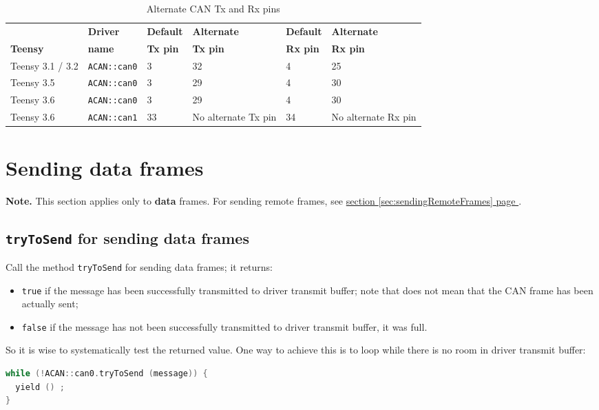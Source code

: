 \documentclass[9pt, a4paper, obeyspaces, openany]{extarticle}
\newcommand \sectionLabel[2]{\section{#1}\label{sec:#2}}
\newcommand\refSectionPage[1]{\hyperref[sec:#1]{section \ref*{sec:#1} page \pageref{sec:#1}}}
\newcommand\labelTableau[1]{\label{tab:#1}}
\begin{document}
\begin{table}[htbp]
  \small
  \onehalfspacing
  \centering
  \begin{tabular}{llllll}
                   &  \textbf{Driver}  &  \textbf{Default} & \textbf{Alternate} & \textbf{Default} & \textbf{Alternate}\\
    \textbf{Teensy}& \textbf{name} & \textbf{Tx pin} & \textbf{Tx pin} & \textbf{ Rx pin} & \textbf{ Rx pin}\\
    Teensy 3.1 / 3.2 & \texttt{ACAN::can0}      & 3        & 32      & 4 & 25\\
    Teensy 3.5 &  \texttt{ACAN::can0}           & 3        & 29      & 4 & 30\\
    Teensy 3.6 &  \texttt{ACAN::can0}           & 3        & 29      & 4 & 30 \\
    Teensy 3.6 &  \texttt{ACAN::can1}           & 33 & No alternate Tx pin & 34 & No alternate Rx pin\\
  \end{tabular}
  \caption{Alternate CAN Tx and Rx pins}
  \labelTableau{alternatePins}
\end{table}


\sectionLabel{Sending data frames}{sendingDataFrames}

{\bf Note. } This section applies only to {\bf data} frames. For sending remote frames, see \refSectionPage{sendingRemoteFrames}.

\subsection{\texttt{tryToSend} for sending data frames}
Call the method \texttt{tryToSend} for sending data frames; it returns:
\begin{itemize}
  \item \texttt{true} if the message has been successfully transmitted to driver transmit buffer; note that does not mean that the CAN frame has been actually sent;
  \item \texttt{false} if the message has not been successfully transmitted to driver transmit buffer, it was full.
\end{itemize}

So it is wise to systematically test the returned value. One way to achieve this is to loop while there is no room in driver transmit buffer:
{ \small
  \begin{lstlisting}[language=c++]
while (!ACAN::can0.tryToSend (message)) {
  yield () ;
}
  \end{lstlisting}
}
\end{document}
